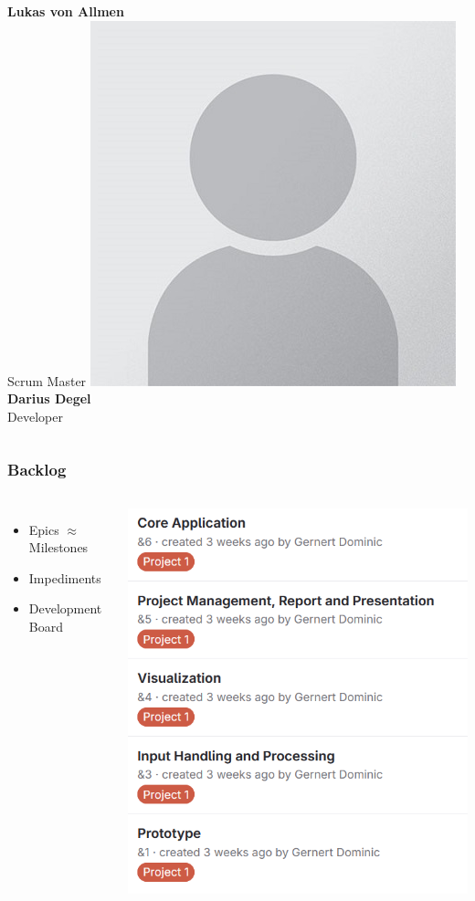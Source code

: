 \begin{frame}
\begin{columns}
        \textbf{Lukas von Allmen} \\ \small{Scrum Master}
        \centering
        \includegraphics[width=0.45\linewidth]{../assets/avatar_placeholder.jpg} \\
        \textbf{Darius Degel} \\ \small{Developer}
    \end{columns}
\end{frame}

\begin{frame}
    \frametitle{Backlog}
    \begin{columns}
        \begin{itemize}
            \large
            \item Epics \ensuremath{\approx} Milestones
            \item Impediments
            \item Development Board
        \end{itemize}
        \includegraphics[width=0.8\linewidth]{../assets/epics_interim_presentation.png}
    \end{columns}
\end{frame}

